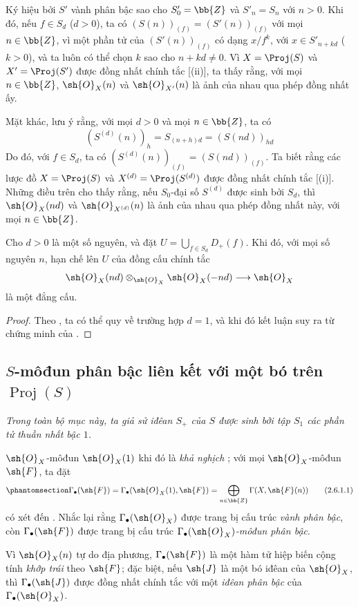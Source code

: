 \documentclass[oneside,10pt]{amsart}
\makeatletter
\newcommand{\ega@arrow}[2]{\mathchoice{#1}{#2}{#2}{#2}}
\renewcommand{\to}{\ega@arrow{\longrightarrow}{\rightarrow}}
\let\EGAOriginalLabel\label
\renewcommand{\label}[1]{\phantomsection\EGAOriginalLabel{#1}}
\makeatother
\begin{document}
\begin{env}[2.5.16]
\label{II.2.5.16}
Ký hiệu bởi $S'$ vành phân bậc sao cho $S'_0=\bb{Z}$ và $S'_n=S_n$ với $n>0$.
Khi đó, nếu $f\in S_d$ ($d>0$), ta có $(S(n))_{(f)}=(S'(n))_{(f)}$ với mọi $n\in\bb{Z}$, vì một phần tử của $(S'(n))_{(f)}$ có dạng $x/f^k$, với $x\in S'_{n+kd}$ ($k>0$), và ta luôn có thể chọn $k$ sao cho $n+kd\neq0$.
Vì $X=\Proj(S)$ và $X'=\Proj(S')$ được đồng nhất chính tắc [(ii)], ta thấy rằng, với mọi $n\in\bb{Z}$, $\sh{O}_X(n)$ và $\sh{O}_{X'}(n)$ là ảnh của nhau qua phép đồng nhất ấy.

Mặt khác, lưu ý rằng, với mọi $d>0$ và mọi $n\in\bb{Z}$, ta có
\[
  (S^{(d)}(n))_h=S_{(n+h)d}=(S(nd))_{hd}
\]
Do đó, với $f\in S_d$, ta có $(S^{(d)}(n))_{(f)}=(S(nd))_{(f)}$.
Ta biết rằng các lược đồ $X=\Proj(S)$ và $X^{(d)}=\Proj(S^{(d)})$ được đồng nhất chính tắc [(i)].
Những điều trên cho thấy rằng, nếu $S_0$-đại số $S^{(d)}$ được sinh bởi $S_d$, thì $\sh{O}_X(nd)$ và $\sh{O}_{X^{(d)}}(n)$ là ảnh của nhau qua phép đồng nhất này, với mọi $n\in\bb{Z}$.
\end{env}

\begin{proposition}[2.5.17]
\label{II.2.5.17}
Cho $d>0$ là một số nguyên, và đặt $U=\bigcup_{f\in S_d}D_+(f)$.
Khi đó, với mọi số nguyên $n$, hạn chế lên $U$ của đồng cấu chính tắc
\[
  \sh{O}_X(nd)\otimes_{\sh{O}_X}\sh{O}_X(-nd)\to\sh{O}_X
\]
là một đẳng cấu.
\end{proposition}

\begin{proof}
Theo , ta có thể quy về trường hợp $d=1$, và khi đó kết luận suy ra từ chứng minh của .
\end{proof}

\subsection{$S$-môđun phân bậc liên kết với một bó trên $\operatorname{Proj}(S)$}
\label{subsection:II.2.6}

\emph{Trong toàn bộ mục này, ta giả sử iđêan $S_+$ của $S$ được sinh bởi tập $S_1$ các phần tử thuần nhất bậc $1$.}

\begin{env}[2.6.1]
\label{II.2.6.1}
$\sh{O}_X$-môđun $\sh{O}_X(1)$ khi đó là \emph{khả nghịch} ; với mọi $\sh{O}_X$-môđun $\sh{F}$, ta đặt 
\[
\label{II.2.6.1.1}
  \Gamma_\bullet(\sh{F})
  =\Gamma_\bullet(\sh{O}_X(1),\sh{F})
  =\bigoplus_{n\in\bb{Z}}\Gamma(X,\sh{F}(n))
\tag{2.6.1.1}
\]
có xét đến .
Nhắc lại  rằng $\Gamma_\bullet(\sh{O}_X)$ được trang bị cấu trúc \emph{vành phân bậc}, còn $\Gamma_\bullet(\sh{F})$ được trang bị cấu trúc \emph{$\Gamma_\bullet(\sh{O}_X)$-môđun phân bậc}.

Vì $\sh{O}_X(n)$ tự do địa phương, $\Gamma_\bullet(\sh{F})$ là một hàm tử hiệp biến cộng tính \emph{khớp trái} theo $\sh{F}$; đặc biệt, nếu $\sh{J}$ là một bó iđêan của $\sh{O}_X$, thì $\Gamma_\bullet(\sh{J})$ được đồng nhất chính tắc với một \emph{iđêan phân bậc} của $\Gamma_\bullet(\sh{O}_X)$.
\end{env}
\end{document}
